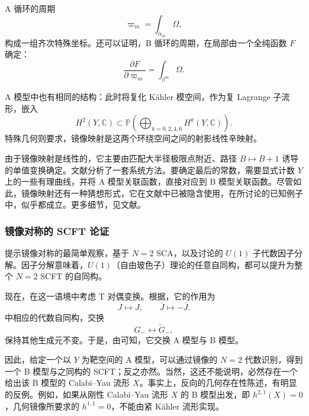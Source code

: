 A 循环的周期
\begin{equation}\label{eq:3.132}
\varpi_m=\int_{\alpha_m}\Omega,
\end{equation}
构成一组齐次特殊坐标。还可以证明，B 循环的周期，在局部由一个全纯函数 $F$ 确定：
\begin{equation}\label{eq:3.133}
\frac{\partial F}{\partial\varpi_m}=\int_{\beta^m}\Omega.
\end{equation}

A 模型中也有相同的结构：此时将复化 K\"ahler 模空间，作为复 Lagrange 子流形，嵌入
\[
H^2(Y,\mathbb{C})\subset
\mathbb{P}\!\left(\bigoplus_{k=0,2,4,6}H^k(Y,\mathbb{C})\right).
\]
特殊几何则要求，镜像映射是这两个环绕空间之间的射影线性辛映射。

由于镜像映射是线性的，它主要由匹配大半径极限点附近、路径 $B\mapsto B+1$ 诱导的单值变换确定。文献分析了一套系统方法。要确定最后的常数，需要显式计数 $Y$ 上的一些有理曲线，并将 A 模型关联函数，直接对应到 B 模型关联函数。尽管如此，镜像映射还有一种猜想形式，它在文献中已被隐含使用，在所讨论的已知例子中，似乎都成立。更多细节，见文献。

\subsubsection{镜像对称的 SCFT 论证}\label{sec:3.4.3.2}

提示镜像对称的最简单观察，基于 $N=2$ SCA，以及讨论的 $U(1)$ 子代数因子分解。因子分解意味着，$U(1)$（自由玻色子）理论的任意自同构，都可以提升为整个 $N=2$ SCFT 的自同构。

现在，在这一语境中考虑 T 对偶变换。根据，它的作用为
\begin{equation}\label{eq:3.134}
J\longmapsto J,\qquad\bar J\longmapsto-\bar J.
\end{equation}
中相应的代数自同构，交换
\[
G_-\longleftrightarrow\widetilde G_-,
\]
保持其他生成元不变。于是，由可知，它交换 A 模型与 B 模型。

因此，给定一个以 $Y$ 为靶空间的 A 模型，可以通过镜像的 $N=2$ 代数识别，得到一个 B 模型与之同构的 SCFT；反之亦然。当然，这还不能说明，必然存在一个给出该 B 模型的 Calabi--Yau 流形 $X$。事实上，反向的几何存在性陈述，有明显的反例。例如，如果从刚性 Calabi--Yau 流形 $X$ 的 B 模型出发，即 $h^{2,1}(X)=0$，几何镜像所要求的 $h^{1,1}=0$，不能由紧 K\"ahler 流形实现。

